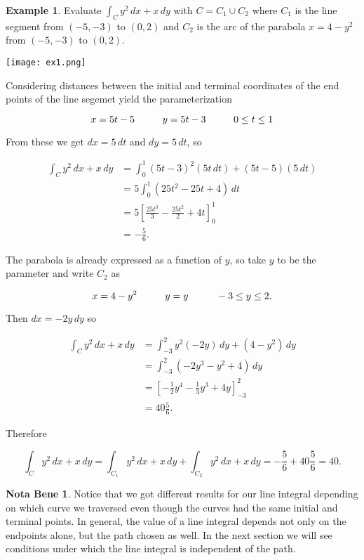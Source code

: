 \documentclass[11pt,oneside,english]{amsart}
\theoremstyle{definition}
\newtheorem*{example}{Example}
\newtheorem*{note}{Nota Bene}
\newcommand{\pspace}{\hspace{10mm}}
\begin{document}
\begin{example}
Evaluate $\displaystyle \int_Cy^2\,dx+x\,dy$ with $C=C_1\cup C_2$ where $C_1$ is the line segment from $(-5,-3)$ to $(0,2)$ and $C_2$ is the arc of the parabola $x=4-y^2$ from $(-5,-3)$ to $(0,2)$.

\begin{center}
\texttt{[image: ex1.png]}
\end{center}

Considering distances between the initial and terminal coordinates of the end points of the line segemet yield the parameterization 

\[
x=5t-5\pspace y=5t-3\pspace 0\leq t\leq 1
\]

From these we get $dx=5\,dt$ and $dy=5\,dt$, so

\begin{align*}
\int_Cy^2\,dx+x\,dy&=\int_0^1 (5t-3)^2(5t\,dt)+(5t-5)(5\,dt)\\[2mm]
&=5\int_0^1(25t^2-25t+4)\,dt\\[2mm]
&=5\left[\frac{25t^3}{3}-\frac{25t^2}{2}+4t\right]_0^1\\[2mm]
&=-\frac{5}{6}.
\end{align*}

The parabola is already expressed as a function of $y$, so take $y$ to be the parameter and write $C_2$ as

\[
x=4-y^2\pspace y=y\pspace -3\leq y\leq 2.
\]

Then $dx=-2y\,dy$ so

\begin{align*}
\int_Cy^2\,dx+x\,dy&=\int_{-3}^2y^2(-2y)\,dy+(4-y^2)\,dy\\[2mm]
&=\int_{-3}^2(-2y^3-y^2+4)\,dy\\[2mm]
&=\left[-\frac{1}{2}y^4-\frac{1}{3}y^3+4y\right]_{-3}^2\\[2mm]
&=40\frac{5}{6}.
\end{align*}

Therefore

\[
 \int_Cy^2\,dx+x\,dy=\int_{C_1}y^2\,dx+x\,dy+\int_{C_2}y^2\,dx+x\,dy=-\frac{5}{6}+40\frac{5}{6}=40.
\]
\end{example}


\begin{note}
Notice that we got different results for our line integral depending on which curve we traversed even though the curves had the same initial and terminal points. In general, the value of a line integral depends not only on the endpoints alone, but the path chosen as well. In the next section we will see conditions under which the line integral is independent of the path.
\end{note}
\end{document}
